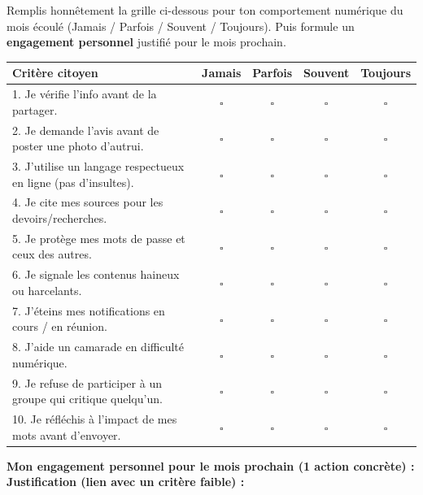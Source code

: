 \documentclass[11pt]{article}
\begin{document}
\begin{exercice}
Remplis honnêtement la grille ci-dessous pour ton comportement numérique du mois écoulé (Jamais / Parfois / Souvent / Toujours). Puis formule un \textbf{engagement personnel} justifié pour le mois prochain.

\begin{center}
\begin{tabularx}{\linewidth}{|X|c|c|c|c|}\hline
\rowcolor{popblueL}\textbf{Critère citoyen} & \textbf{Jamais} & \textbf{Parfois} & \textbf{Souvent} & \textbf{Toujours} \\\hline
1. Je vérifie l'info avant de la partager. & $\square$ & $\square$ & $\square$ & $\square$ \\\hline
2. Je demande l'avis avant de poster une photo d'autrui. & $\square$ & $\square$ & $\square$ & $\square$ \\\hline
3. J'utilise un langage respectueux en ligne (pas d'insultes). & $\square$ & $\square$ & $\square$ & $\square$ \\\hline
4. Je cite mes sources pour les devoirs/recherches. & $\square$ & $\square$ & $\square$ & $\square$ \\\hline
5. Je protège mes mots de passe et ceux des autres. & $\square$ & $\square$ & $\square$ & $\square$ \\\hline
6. Je signale les contenus haineux ou harcelants. & $\square$ & $\square$ & $\square$ & $\square$ \\\hline
7. J'éteins mes notifications en cours / en réunion. & $\square$ & $\square$ & $\square$ & $\square$ \\\hline
8. J'aide un camarade en difficulté numérique. & $\square$ & $\square$ & $\square$ & $\square$ \\\hline
9. Je refuse de participer à un groupe qui critique quelqu'un. & $\square$ & $\square$ & $\square$ & $\square$ \\\hline
10. Je réfléchis à l'impact de mes mots avant d'envoyer. & $\square$ & $\square$ & $\square$ & $\square$ \\\hline
\end{tabularx}
\end{center}

\textbf{Mon engagement personnel pour le mois prochain (1 action concrète) :} \dotfill \\
\textbf{Justification (lien avec un critère faible) :} \dotfill
\end{exercice}
\end{document}
